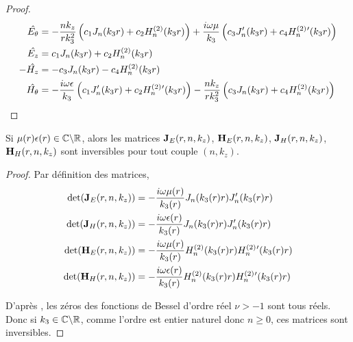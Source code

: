 \begin{proof}
     \begin{align*}
      \hat{E_\theta} &= -\dfrac{nk_z}{rk_3^2}\left(c_1J_n(k_3r) + c_2 H_n^{(2)}(k_3r)\right) + \dfrac{i\omega\mu}{k_3}\left(c_3J_n'(k_3r) + c_4 H_n^{(2)}{}'(k_3r)\right)
      \\
      \hat{E_z} &= c_1 J_n(k_3 r) + c_2 H_n^{(2)}(k_3 r)
      \\
      -\hat{H_z} &= -c_3 J_n(k_3 r) - c_4 H_n^{(2)}(k_3 r)
      \\
      \hat{H_\theta} &= -\dfrac{i\omega\epsilon}{k_3}\left(c_1J_n'(k_3r) + c_2 H_n^{(2)}{}'(k_3r)\right) - \dfrac{nk_z}{rk_3^2}\left(c_3J_n(k_3r) + c_4 H_n^{(2)}(k_3r)\right)
    \end{align*}

  \end{proof}

  \begin{lemme}
    \label{lem:cylindre:imp:inv_matrices_JE-HE}
    Si \(\mu(r)\epsilon(r) \in \mathbb C\backslash\mathbb R\), alors les matrices \(\mathbf{J}_E(r,n,k_z)\), \(\mathbf{H}_E(r,n,k_z)\), \(\mathbf{J}_H(r,n,k_z)\), \(\mathbf{H}_H(r,n,k_z)\) sont inversibles pour tout couple \((n,k_z)\).
  \end{lemme}

  \begin{proof}
    Par définition des matrices,
    \begin{align}
      \det(\mathbf{J}_E(r,n,k_z)) &= -\dfrac{i\omega\mu(r)}{k_3(r)}J_n(k_3(r)r)J_n'(k_3(r)r)
      \\
      \det(\mathbf{J}_H(r,n,k_z)) &= -\dfrac{i\omega\epsilon(r)}{k_3(r)}J_n(k_3(r)r)J_n'(k_3(r)r)
      \\
      \det(\mathbf{H}_E(r,n,k_z)) &= -\dfrac{i\omega\mu(r)}{k_3(r)}H_n^{(2)}(k_3(r)r)H_n^{(2)}{}'(k_3(r)r)
      \\
      \det(\mathbf{H}_H(r,n,k_z)) &= -\dfrac{i\omega\epsilon(r)}{k_3(r)}H_n^{(2)}(k_3(r)r)H_n^{(2)}{}'(k_3(r)r)
    \end{align}

    D’après \cite[p.~370]{abramowitz_handbook_1964}, les zéros des fonctions de Bessel d'ordre réel \(\nu >-1\) sont tous réels.
    Donc si \(k_3 \in\mathbb C\backslash\mathbb R\), comme l'ordre est entier naturel donc \(n\ge 0\), ces matrices sont inversibles.
  \end{proof}



